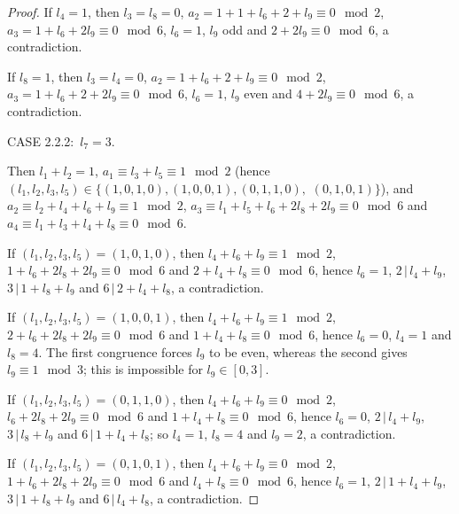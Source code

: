 \documentclass[a4paper, 10pt]{amsart}
\theoremstyle{plain}
\theoremstyle{definition}
\renewcommand{\t}{\, | \,}
\renewcommand{\t}{\, | \,}
\numberwithin{equation}{section}
\begin{document}
{\begin{proof}
If $l_4=1$, then $l_3=l_8=0$, $a_2=1+1+l_6+2+l_9 \equiv 0 \mod 2$,
$a_3 = 1+l_6+2l_9 \equiv 0 \mod 6$, $l_6=1$, $l_9$ odd and $2+2l_9
\equiv 0 \mod 6$, a contradiction.

If $l_8=1$, then $l_3=l_4=0$, $a_2=1+l_6+2+l_9 \equiv 0 \mod 2$,
$a_3=1+l_6+2+2l_9 \equiv 0 \mod 6$, $l_6=1$, $l_9$ even and $4+2l_9
\equiv 0 \mod 6$, a contradiction.

\smallskip
\noindent CASE 2.2.2: \,$l_{7} = 3$.

Then $l_1+l_2 = 1$, $a_1 \equiv l_3+l_5 \equiv 1 \mod 2$ (hence
$(l_1,l_2,l_3,l_5) \in \{(1,0,1,0), (1,0,0,1), (0,1,1,0),$ $
(0,1,0,1)\}$), and $a_2 \equiv l_2+l_4+l_6+l_9 \equiv 1 \mod 2$,
$a_3 \equiv l_1+l_5+l_6+2l_8+2l_9 \equiv 0 \mod 6$ and $a_4 \equiv
l_1+l_3+l_4+l_8 \equiv 0 \mod 6$.

If $(l_1,l_2,l_3,l_5) = (1,0,1,0)$, then $l_4+l_6+l_9 \equiv 1 \mod
2$, $1+l_6+2l_8+2l_9 \equiv 0 \mod 6$ and $2+l_4+l_8 \equiv 0 \mod
6$, hence $l_6 = 1$, $2 \t l_4+l_9$, $3 \t 1+l_8+l_9$ and $6 \t
2+l_4+l_8$, a contradiction.

If $(l_1,l_2,l_3,l_5) = (1,0,0,1)$, then $l_4+l_6+l_9 \equiv 1 \mod
2$, $2+l_6+2l_8+2l_9 \equiv 0 \mod 6$ and $1+l_4+l_8 \equiv 0 \mod
6$, hence $l_6 = 0$, $l_4=1$ and $l_8=4$. The first congruence forces $l_9$ to be even, whereas the second gives $l_9\equiv1\mod3$; this is impossible for $l_9\in[0,3]$. 

If $(l_1,l_2,l_3,l_5) = (0,1,1,0)$, then $l_4+l_6+l_9 \equiv 0 \mod
2$, $l_6+2l_8+2l_9 \equiv 0 \mod 6$ and $1+l_4+l_8 \equiv 0 \mod 6$,
hence $l_6=0$, $2 \t l_4+l_9$, $3 \t l_8+l_9$ and $6 \t 1+l_4+l_8$;
so $l_4=1$, $l_8=4$ and $l_9=2$, a contradiction.

If $(l_1,l_2,l_3,l_5) = (0,1,0,1)$, then $l_4+l_6+l_9 \equiv 0 \mod
2$, $1+l_6+2l_8+2l_9 \equiv 0 \mod 6$ and $l_4+l_8 \equiv 0 \mod 6$,
hence $l_6=1$, $2 \t 1+l_4+l_9$, $3 \t 1+l_8+l_9$ and $6 \t
l_4+l_8$, a contradiction.


\end{proof}}
\end{document}

